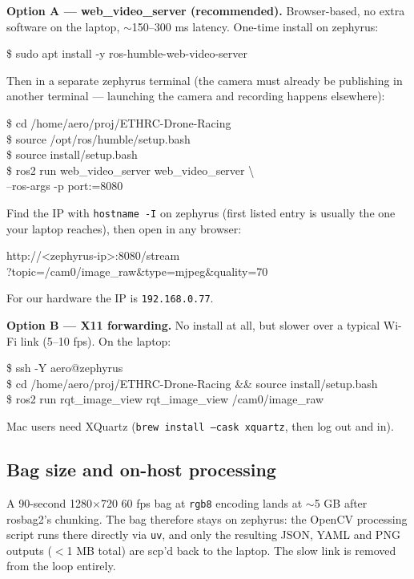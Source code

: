 \documentclass[11pt,a4paper]{article}
\begin{document}
\textbf{Option A --- web\_video\_server (recommended).} Browser-based, no extra software on the laptop, $\sim$150--300 ms latency. One-time install on zephyrus:
\begin{codebox}
\$ sudo apt install -y ros-humble-web-video-server
\end{codebox}
Then in a separate zephyrus terminal (the camera must already be publishing in another terminal --- launching the camera and recording happens elsewhere):
\begin{codebox}
\$ cd /home/aero/proj/ETHRC-Drone-Racing\\
\$ source /opt/ros/humble/setup.bash\\
\$ source install/setup.bash\\
\$ ros2 run web\_video\_server web\_video\_server \textbackslash{}\\
\quad   --ros-args -p port:=8080
\end{codebox}
Find the IP with \texttt{hostname -I} on zephyrus (first listed entry is usually the one your laptop reaches), then open in any browser:
\begin{codebox}
http://<zephyrus-ip>:8080/stream\\
\quad ?topic=/cam0/image\_raw\&type=mjpeg\&quality=70
\end{codebox}
For our hardware the IP is \texttt{192.168.0.77}.

\textbf{Option B --- X11 forwarding.} No install at all, but slower over a typical Wi-Fi link (5--10 fps). On the laptop:
\begin{codebox}
\$ ssh -Y aero@zephyrus\\
\$ cd /home/aero/proj/ETHRC-Drone-Racing \&\& source install/setup.bash\\
\$ ros2 run rqt\_image\_view rqt\_image\_view /cam0/image\_raw
\end{codebox}
Mac users need XQuartz (\texttt{brew install --cask xquartz}, then log out and in).

\subsection{Bag size and on-host processing}

A 90-second 1280$\times$720 60 fps bag at \texttt{rgb8} encoding lands at $\sim$5 GB after rosbag2's chunking. The bag therefore stays on zephyrus: the OpenCV processing script runs there directly via \texttt{uv}, and only the resulting JSON, YAML and PNG outputs ($<$1 MB total) are scp'd back to the laptop. The slow link is removed from the loop entirely.
\end{document}

